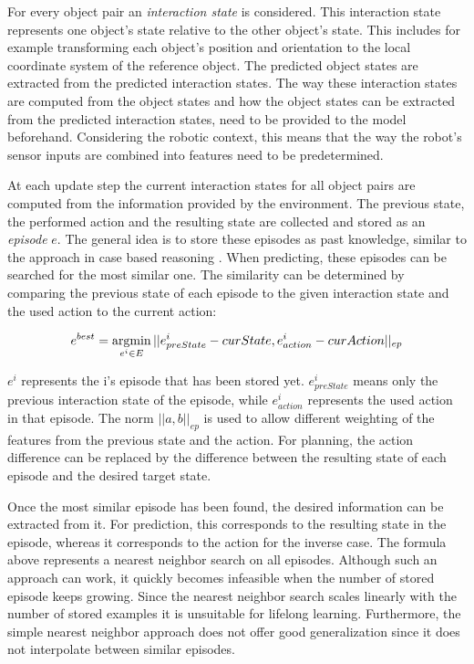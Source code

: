 For every object pair an \textit{interaction state} is considered. This interaction state represents one object's state relative to the other object's state. This includes for example transforming each object's position and orientation to the local coordinate system of the reference object. %
The predicted object states are extracted from the predicted interaction states. The way these interaction states are computed from the object states and how the object states can be extracted from the predicted interaction states, need to be provided to the model beforehand. Considering the robotic context, this means that the way the robot's sensor inputs are combined into features need to be predetermined.

At each update step the current interaction states for all object pairs are computed from the information provided by the environment. The previous state, the performed action and the resulting state are collected and stored as an \textit{episode} $e$. The general idea is to store these episodes as past knowledge, similar to the approach in case based reasoning \cite{cbr}. When predicting, these episodes can be searched for the most similar one. The similarity can be determined by comparing the previous state of each episode to the given interaction state and the used action to the current action:

\begin{equation}
e^{best} = \argmin_{e^i \in E} ||e^i_{preState}-curState, e^i_{action}-curAction||_{ep}
\label{eq:bestEpisode}
\end{equation}


$e^i$ represents the i's episode that has been stored yet. $e^i_{preState}$ means only the previous interaction state of the episode, while $e^i_{action}$ represents the used action in that episode.
The norm $||a,b||_{ep}$ is used to allow different weighting of the features from the previous state and the action. For planning, the action difference can be replaced by the difference between the resulting state of each episode and the desired target state.

Once the most similar episode has been found, the desired information can be extracted from it. For prediction, this corresponds to the resulting state in the episode, whereas it corresponds to the action for the inverse case. The formula above represents a nearest neighbor search on all episodes. Although such an approach can work, it quickly becomes infeasible when the number of stored episode keeps growing. Since the nearest neighbor search scales linearly with the number of stored examples it is unsuitable for lifelong learning. 
Furthermore, the simple nearest neighbor approach does not offer good generalization since it does not interpolate between similar episodes. 

